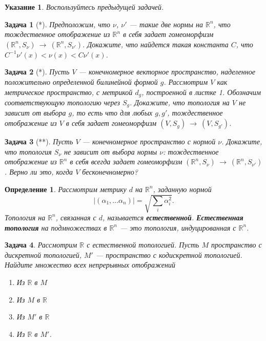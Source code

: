 \documentclass[12pt]{book}
\newcommand{\arrow}{{\:\longrightarrow\:}}
\def\R{{\mathbb R}}
\theoremstyle{upshape}
\newtheorem{zadacha}{Задача}[chapter]
\theoremstyle{generic}
\newtheorem{opredelenie}[teorema]{Определение}
\theoremstyle{upshapenonumber}
\newtheorem{ukazanie}{Указание}[section]
\newcommand{\следствие}{%
     \refstepcounter{teorema}
     {\noindent\bf Следствие \thechapter.\arabic{teorema}:\ }}
\newcommand{\пример}{%
     \refstepcounter{teorema}
     {\noindent\bf Пример \thechapter.\arabic{teorema}:\ }}
\newcommand{\лемма}{%
     \refstepcounter{teorema}
     {\noindent\bf Лемма \thechapter.\arabic{teorema}:\ }}
\newcommand{\теорема}{%
     \refstepcounter{teorema}
     {\noindent\bf Теорема \thechapter.\arabic{teorema}:\ }}
\newcommand{\утверждение}{%
     \refstepcounter{teorema}
     {\noindent\bf Утверждение \thechapter.\arabic{teorema}:\ }}
\def\ит{\it}
\def\итем{\item %
}
\begin{document}
{\begin{ukazanie}
Воспользуйтесь предыдущей задачей.
\end{ukazanie}

\begin{zadacha}[*]
Предположим, что $\nu$, $\nu'$ --- такие две нормы на $\R^n$, что
тождественное отображение из $\R^n$ в себя задает гомеоморфизм
$(\R^n, S_\nu)\arrow (\R^n, S_{\nu'})$. Докажите, что найдется такая
константа $C$, что $C^{-1} \nu'(x) <\nu(x)< C \nu'(x)$.
\end{zadacha}

\begin{zadacha}[*]
Пусть $V$ --- конечномерное 
векторное пространство, наделенное положительно
определенной билинейной формой $g$. Рассмотрим $V$ как метрическое
пространство, с метрикой $d_g$, построенной в листке 1. 
Обозначим соответствующую топологию через $S_g$. Докажите, что
топология на $V$ не зависит от выбора $g$, то есть что для любых $g,
g'$, тождественное отображение из $V$ в себя задает гомеоморфизм
$(V, S_g)\arrow (V, S_{g'})$.
\end{zadacha}

\begin{zadacha}[**]
Пусть $V$ --- конечномерное пространство с нормой $\nu$.
Докажите, что топология $S_\nu$ не зависит от выбора нормы $\nu$:
тождественное отображение из $\R^n$ в себя всегда задает
гомеоморфизм $(\R^n, S_\nu)\arrow (\R^n, S_{\nu'})$.
Верно ли это, когда $V$ бесконечномерно?
\end{zadacha}

\begin{opredelenie}
Рассмотрим метрику $d$ на $\R^n$, заданную
нормой 
\[ 
|(\alpha_1, ... \alpha_n)|= \sqrt{\sum_i \alpha_i^2}.
\]
Топология на $\R^n$, связанная с $d$, называется {\bf естественной}.
{\bf Естественная топология} на подмножествах в $\R^n$ --- это
топология, индуцированная с $\R^n$.
\end{opredelenie}

\begin{zadacha} 
Рассмотрим $\R$ с естественной топологией.  Пусть $M$ пространство с
дискретной топологией, $M'$ --- пространство с кодискретной
топологией.  Найдите множество всех непрерывных отображений
\begin{enumerate}
\итем Из $\R$ в $M$

\итем Из $M$ в $\R$

\итем Из $M'$ в $\R$

\итем Из $\R$ в $M'$.
\end{enumerate}
\end{zadacha}

}
\end{document}
